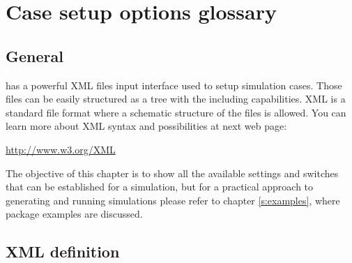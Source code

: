 \chapter{Case setup options glossary}
\label{s:caseSetup}
%
\section{General}
%
\NAME has a powerful XML files input interface used to setup simulation cases.
Those files can be easily structured as a tree with the including capabilities.
XML is a standard file format where a schematic structure of the files is
allowed. You can learn more about XML syntax and possibilities at next web page:
%
\begin{center}
    \url{http://www.w3.org/XML}
\end{center}
%
The objective of this chapter is to show all the available settings and switches
that can be established for a \NAME simulation, but for a practical approach
to generating and running simulations please refer to chapter \ref{s:examples},
where \NAME package examples are discussed.
%
\section{XML definition}
%
